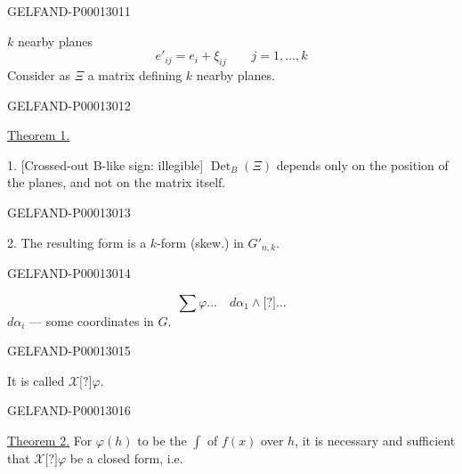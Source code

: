 \begin{GelfandAdjacentEvidence}{GELFAND-P000130}{11}

$k$ nearby planes
\begin{equation*}e'_{ij}=e_i+\xi_{ij}\qquad j=1,\ldots, k\end{equation*}
Consider as $\Xi$ a matrix defining $k$ nearby planes.
\end{GelfandAdjacentEvidence}
\begin{GelfandAdjacentEvidence}{GELFAND-P000130}{12}

\underline{Theorem 1.}

1. [Crossed-out B-like sign: illegible] $\operatorname{Det}_B (\Xi)$ depends only on the position of the planes, and not on the matrix itself.
\end{GelfandAdjacentEvidence}
\begin{GelfandAdjacentEvidence}{GELFAND-P000130}{13}

2. The resulting form is a $k$-form (skew.) in $G'_{n, k}$.
\end{GelfandAdjacentEvidence}
\begin{GelfandAdjacentEvidence}{GELFAND-P000130}{14}

\begin{equation*}\sum\varphi\ldots\quad d\alpha_1\wedge\text{[?]}\ldots\end{equation*}
$d\alpha_i$ --- some coordinates in $G$.
\end{GelfandAdjacentEvidence}
\begin{GelfandAdjacentEvidence}{GELFAND-P000130}{15}

It is called $\mathcal X\text{[?]}\varphi$.
\end{GelfandAdjacentEvidence}
\begin{GelfandAdjacentEvidence}{GELFAND-P000130}{16}

\underline{Theorem 2.} For $\varphi (h)$ to be the $\int$ of $f (x)$ over $h$, it is necessary and sufficient that $\mathcal X\text{[?]}\varphi$ be a closed form, i.e.
\end{GelfandAdjacentEvidence}
